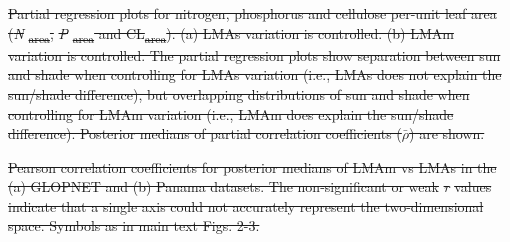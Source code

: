 \documentclass[
  12pt,
  letterpaper,
  DIV=11,
  numbers=noendperiod]{scrartcl}
\numberwithin{equation}{section} %
\providecommand{\DIFdel}[1]{{\protect\color{red}\sout{#1}}}                      %
\providecommand{\DIFdelend}{} %
\DeclareRobustCommand{\DIFdelend}{\DIFOaddend \let\includegraphics\DIFOincludegraphics} %
\begin{document}





{%
\DIFdel{Partial regression plots for
nitrogen, phosphorus and cellulose per-unit leaf area
(}\emph{\DIFdel{N}}%
\DIFdel{\textsubscript{area}, }\emph{\DIFdel{P}}%
\DIFdel{\textsubscript{area} and
CL\textsubscript{area}). (a) LMAs variation is controlled. (b) LMAm
variation is controlled. The partial regression plots show separation
between sun and shade when controlling for LMAs variation (i.e., LMAs
does not explain the sun/shade difference), but overlapping
distributions of sun and shade when controlling for LMAm variation
(i.e., LMAm does explain the sun/shade difference). Posterior medians of
partial correlation coefficients (\(\bar{\rho}\)) are shown.}}







{%
\DIFdel{Pearson correlation coefficients for
posterior medians of LMAm vs LMAs in the (a) GLOPNET and (b) Panama
datasets. The non-significant or weak }\emph{\DIFdel{r}} %
\DIFdel{values indicate that a
single axis could not accurately represent the two-dimensional space.
Symbols as in main text Figs. 2-3.}}


\DIFdelend \newpage
\end{document}
